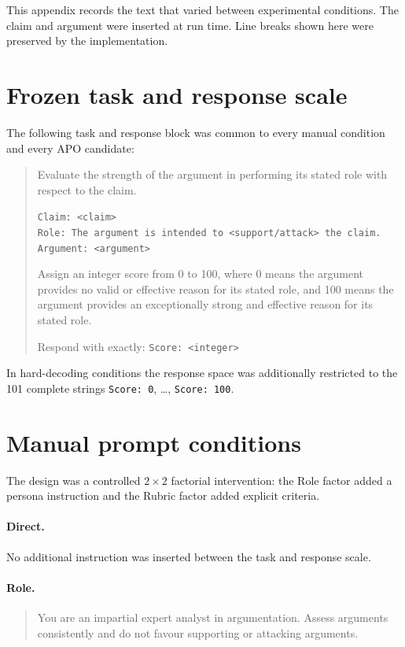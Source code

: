 \documentclass[11pt,twoside,a4paper]{report}
\begin{document}
This appendix records the text that varied between experimental conditions.
The claim and argument were inserted at run time.  Line breaks shown here were
preserved by the implementation.

\section{Frozen task and response scale}

The following task and response block was common to every manual condition and
every APO candidate:

\begin{quote}\small
Evaluate the strength of the argument in performing its stated role with respect
to the claim.

\texttt{Claim: <claim>}\\
\texttt{Role: The argument is intended to <support/attack> the claim.}\\
\texttt{Argument: <argument>}

Assign an integer score from 0 to 100, where 0 means the argument provides no
valid or effective reason for its stated role, and 100 means the argument
provides an exceptionally strong and effective reason for its stated role.

Respond with exactly: \texttt{Score: <integer>}
\end{quote}

In hard-decoding conditions the response space was additionally restricted to
the 101 complete strings \texttt{Score: 0}, \ldots, \texttt{Score: 100}.

\section{Manual prompt conditions}

The design was a controlled $2\times2$ factorial intervention: the Role factor
added a persona instruction and the Rubric factor added explicit criteria.

\paragraph{Direct.}
No additional instruction was inserted between the task and response scale.

\paragraph{Role.}
\begin{quote}\small
You are an impartial expert analyst in argumentation. Assess arguments
consistently and do not favour supporting or attacking arguments.
\end{quote}
\end{document}
